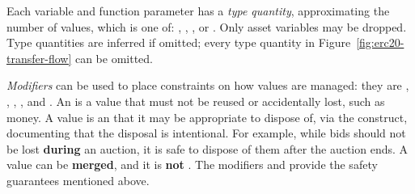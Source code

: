 \documentclass[nonacm, dvipsnames, sigconf]{acmart}
\begin{document}
Each variable and function parameter has a \emph{type quantity}, approximating the number of values, which is one of: , , , or . %
Only  asset variables may be dropped.
Type quantities are inferred if omitted; every type quantity in Figure~\ref{fig:erc20-transfer-flow} can be omitted.

\emph{Modifiers} can be used to place constraints on how values are managed: they are , , , , and .
An  is a value that must not be reused or accidentally lost, such as money.
A  value is an  that it may be appropriate to dispose of, via the  construct, documenting that the disposal is intentional.
For example, while bids should not be lost \textbf{during} an auction, it is safe to dispose of them after the auction ends.
A  value can be \textbf{merged}, and it is \textbf{not} .
The modifiers  and  provide the safety guarantees mentioned above.
\end{document}
